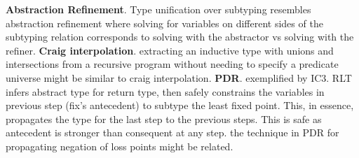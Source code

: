 \documentclass[letterpaper]{llncs}
\begin{document}
\newline
\textbf{Abstraction Refinement}. Type unification over subtyping resembles abstraction refinement  
where solving for variables on different sides of the subtyping relation corresponds to
solving with the abstractor vs solving with the refiner.
\newline
\textbf{Craig interpolation}. extracting an inductive type with unions and intersections 
from a recursive program without needing to specify a predicate universe might be similar to
craig interpolation. \newline
\textbf{PDR}. exemplified by IC3. RLT infers abstract type for return type, 
then safely constrains the variables in previous step (fix's antecedent) 
to subtype the least fixed point.
This, in essence, propagates the type for the last step to the previous steps.
This is safe as antecedent is stronger than consequent at any step.
the technique in PDR for propagating negation of loss points might be related. 
 \newline 
\end{document}
